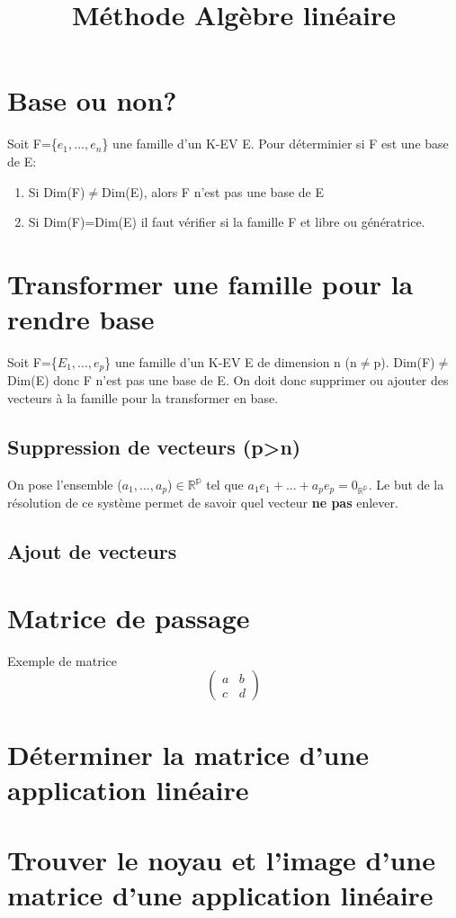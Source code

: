 \documentclass{article}
\author{}
\date{}
\title{Méthode Algèbre linéaire}
\begin{document}
\maketitle
\section{Base ou non?}
Soit F=\{$e_{1},...,e_{n}$\} une famille d'un K-EV E. Pour déterminier si F est une base de E:
\begin{enumerate}
    \item Si Dim(F)$\neq$Dim(E), alors F n'est pas une base de E
    \item Si Dim(F)=Dim(E) il faut vérifier si la famille F et libre ou génératrice.
\end{enumerate}
\section{Transformer une famille pour la rendre base}
Soit F=\{$E_{1},...,e_{p}$\} une famille d'un K-EV E de dimension n (n$\neq$p). Dim(F)$\neq$Dim(E) donc F n'est pas une base de E. On doit donc supprimer ou ajouter des vecteurs à la famille pour la transformer en base.\newline
\subsection{Suppression de vecteurs (p>n)}
On pose l'ensemble ($a_{1},...,a_{p}$)$\in \mathbb{R^{p}}$ tel que $a_{1}e_{1}+...+a_{p}e_{p} = 0_{\mathbb{R^{p}}}$. Le but de la résolution de ce système permet de savoir quel vecteur \textbf{ne pas} enlever.
\subsection{Ajout de vecteurs}

\section{Matrice de passage}
Exemple de matrice
$$\left(
    \begin{array}{cc}
    a & b \\
    c & d 
    \end{array} 
  \right)$$
\section{Déterminer la matrice d'une application linéaire}
\section{Trouver le noyau et l'image d'une matrice d'une application linéaire}
\end{document}
